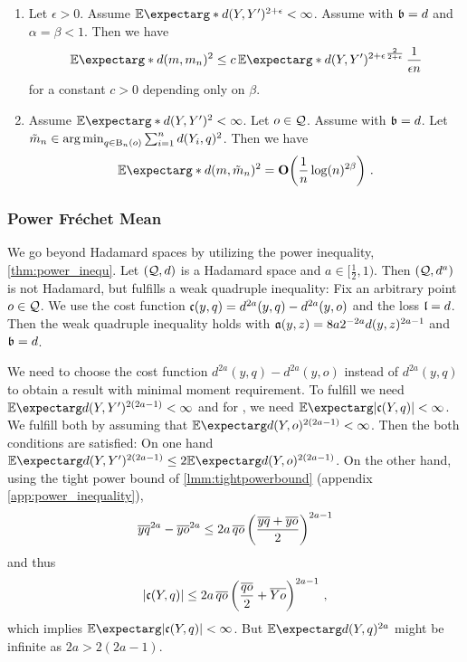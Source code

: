\begin{corollary}
\theoremContentInNewLine
	\begin{enumerate}[label=\environmentEnumerateLabel]
	\item 
		Let $\epsilon > 0$.
		Assume $\Ex*{d(Y,Y\pr)^{2+\epsilon}} < \infty$.
		Assume   with $\mathfrak{b} = d$ and $\alpha=\beta < 1$.
		Then we have
		\begin{equation*}
			\Ex*{d(m, m_n)^2} \leq c\, \Ex*{d(Y,Y\pr)^{2+\epsilon}}^{\frac{2}{2+\epsilon}} \,\frac1{\epsilon n }
		\end{equation*}
		for a constant $c>0$ depending only on $\beta$.
	\item 
		Assume $\Ex*{d(Y,Y\pr)^2} < \infty$.
		Let $o\in\mathcal{Q}$. Assume  with $\mathfrak{b} = d$.
		Let $\tilde m_n \in \operatorname*{arg\,min}_{q\in\operatorname{\mathrm{B}}_n(o)} \sum_{i=1}^n d(Y_i, q)^2$.
		Then we have
		\begin{equation*}
			\Ex*{d(m, \tilde m_n)^2} = \bigO\brOf{\frac1n \log(n)^{2\beta}}
			\eqfs
		\end{equation*}
	\end{enumerate}
\end{corollary}
%
%
\subsubsection{Power Fréchet Mean}\label{sssec:app:hadamard:pfm}
%
We go beyond Hadamard spaces by utilizing the power inequality, \autoref{thm:power_inequ}. 
Let $(\mathcal{Q}, d)$ is a Hadamard space and $a \in[\frac12,1)$. Then $(\mathcal{Q}, d^a)$ is not Hadamard, but fulfills a weak quadruple inequality: Fix an arbitrary point $o\in\mathcal{Q}$. We use the cost function $\mathfrak{c}(y,q) = d^{2a}(y,q)-d^{2a}(y,o)$ and the loss $\mathfrak{l} = d$. Then the weak quadruple inequality holds with $\mathfrak{a} (y,z) = 8a2^{-2a} d(y,z)^{2a-1}$ and $\mathfrak{b} = d$.

We need to choose the cost function $d^{2a}(y,q)-d^{2a}(y,o)$ instead of $d^{2a}(y,q)$ to obtain a result with minimal moment requirement. To fulfill  we need $\Ex{d(Y,Y\pr)^{2(2a-1)}} < \infty$ and for , we need $\Ex{\abs{\mf c(Y,q)}} < \infty$. We fulfill both by assuming that
$\Ex{d(Y,o)^{2(2a-1)}} < \infty$. Then the both conditions are satisfied: On one hand
$\Ex{d(Y,Y\pr)^{2(2a-1)}} \leq 2 \Ex{d(Y,o)^{2(2a-1)}}$. On the other hand, using 
the tight power bound of \autoref{lmm:tightpowerbound} (appendix \autoref{app:power_inequality}),
\begin{align*}
	\overline{yq}^{2a}-\overline{yo}^{2a}
	\leq 
	2 a \,\overline{qo} \left( \frac{\overline{yq} + \overline{yo}}{2} \right)^{2a-1}
\end{align*} 
and thus 
\begin{equation*}
	|\mathfrak{c}(Y,q)|  \leq 2a \,\overline{qo} \left( \frac{\overline{qo}}{2} +  \overline{Yo} \right)^{2a-1}\, ,
\end{equation*}
which implies 
$\Ex{\abs{\mf c(Y, q)}} < \infty$. But $\Ex{d(Y,q)^{2a}}$ might be infinite as $2a > 2(2a-1)$.

